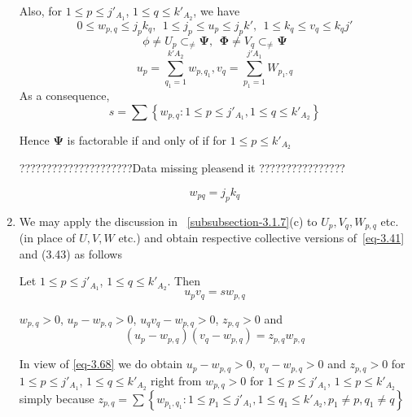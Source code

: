 \documentclass[a4paper,12pt]{article}
\theoremstyle{definition}
\theoremstyle{underlinethm}
\theoremstyle{definition}
\begin{document}
\begin{enumerate}[label=(\alph*)]
Also, for $1 \leq p \leq j'_{A_{1}}$, $1 \leq q \leq k'_{A_{2}}$, we have
\begin{equation}
0 \leq w_{p,q} \leq j_{p}k_{q},~~1 \leq j_{p} \leq u_{p} \leq j_{p}k',~~ 1 \leq k_{q} \leq v_{q} \leq k_{q}j'\tag{3.63}\label{eq-3.63}
\end{equation}
\begin{equation}
\phi \neq U_{p} \subset_{\neq} \boldsymbol{\Psi},~~ \boldsymbol{\Phi} \neq V_{q} \subset_{\neq} \boldsymbol{\Psi}\tag{3.64}\label{eq-3.64}
\end{equation}
\begin{equation}
u_{p}= \sum_{q_{1}=1}^{k'A_{2}} w_{p,q_{1}}, v_{q}=\sum_{p_{1}=1}^{j' A_{1}}W_{p_{1}, q}\tag{3.65}\label{eq-3.35}
\end{equation}
As a consequence,
\begin{equation}
s =\sum \left\{w_{p,q} : 1 \leq p \leq j'_{A_{1}}, 1 \leq q \leq k'_{A_{2}}\right\}\tag{3.66}\label{eq-3.66}
\end{equation}

Hence $\boldsymbol{\Psi}$ is factorable if and only of if for $1\leq p \leq k'_{A_{2}}$ 

?????????????????????Data missing pleasend it ????????????????

\begin{equation}
w_{pq} = j_{p}k_{q}\tag{3.67}\label{eq-3.67}
\end{equation}

\item We may apply the discussion in ~\eqref{subsubsection-3.1.7}(c) to $U_{p}, V_{q}, W_{p,q}$ etc. (in place of $U, V, W$ etc.) and obtain respective collective versions of~\eqref{eq-3.41} and (3.43) as follows

Let $1 \leq p \leq j'_{A_{1}}$, $1 \leq q \leq k'_{A_{2}}$. Then
\begin{equation}
u_{p}v_{q} = sw_{p,q}\tag{3.68}\label{eq-3.68}
\end{equation} 

$w_{p,q}>0$, $u_{p}-w_{p,q} > 0$, $u_{q}v_{q}-w_{p,q} > 0$, $z_{p,q}>0$ and 
\begin{equation}
(u_{p}-w_{p,q})(v_{q}-w_{p,q}) = z_{p,q}w_{p,q}\tag{3.69}\label{eq-3.69}
\end{equation}

In view of \eqref{eq-3.68} we do obtain $u_{p}-w_{p,q}>0$, $v_{q}-w_{p,q}>0$ and $z_{p,q} >0$ for $1 \leq p \leq j'_{A_{1}}$, $1 \leq q \leq k'_{A_{2}}$ right from $w_{p,q}>0$ for $1 \leq p \leq j'_{A_{1}}$, $1 \leq p \leq k'_{A_{2}}$ simply because $z_{p,q} = \sum \left\{w_{p_{1},q_{1}} : 1 \leq p_{1} \leq j'_{A_{1}}, 1 \leq q_{1} \leq k'_{A_{2}}, p_{1} \neq p, q_{1} \neq q \right\}$


\end{enumerate}
\end{document}
